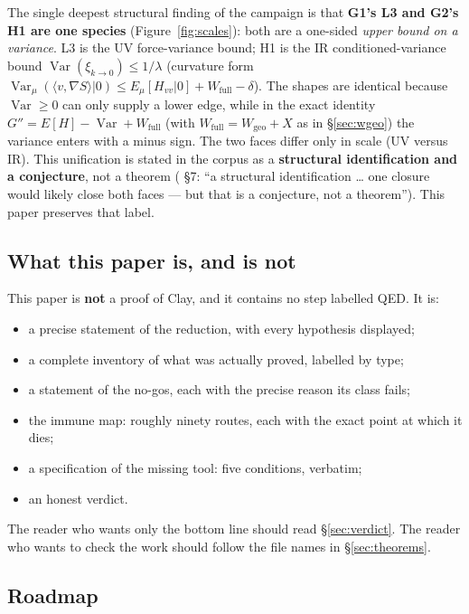 The single deepest structural finding of the campaign is that \textbf{G1's L3 and G2's H1 are
one species} (Figure~\ref{fig:scales}): both are a one-sided \emph{upper bound on a variance}.
L3 is the UV force-variance bound; H1 is the IR conditioned-variance bound
$\operatorname{Var}(\xi_{k\to0})\le1/\lambda$ (curvature form
$\operatorname{Var}_\mu(\langle v,\nabla S\rangle|0)\le E_\mu[H_{vv}|0]+W_{\mathrm{full}}-\delta$).
The shapes are
identical because $\operatorname{Var}\ge0$ can only supply a lower edge, while in the exact
identity $G''=E[H]-\operatorname{Var}+W_{\mathrm{full}}$ (with $W_{\mathrm{full}}=W_{\mathrm{geo}}+X$ as in
\S\ref{sec:wgeo}) the variance enters with a minus sign. The two faces
differ only in scale (UV versus IR). This unification is stated in the corpus as a
\textbf{structural identification and a conjecture}, not a theorem
( \S7: ``a structural identification \ldots{} one closure would likely
close both faces --- but that is a conjecture, not a theorem''). This paper preserves that label.

\figscales

\subsection{What this paper is, and is not}

This paper is \textbf{not} a proof of Clay, and it contains no step labelled QED. It is:

\begin{itemize}
\item a precise statement of the reduction, with every hypothesis displayed;
\item a complete inventory of what was actually proved, labelled by type;
\item a statement of the no-gos, each with the precise reason its class fails;
\item the immune map: roughly ninety routes, each with the exact point at which it dies;
\item a specification of the missing tool: five conditions, verbatim;
\item an honest verdict.
\end{itemize}

The reader who wants only the bottom line should read \S\ref{sec:verdict}. The reader who wants
to check the work should follow the file names in \S\ref{sec:theorems}.

\subsection{Roadmap}

